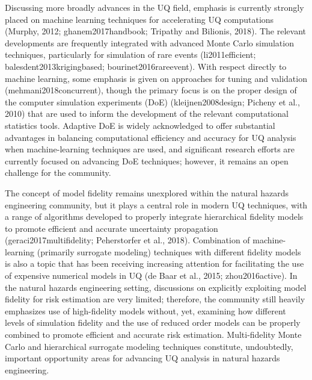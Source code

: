 Discussing more broadly advances in the UQ field, emphasis is currently strongly placed on machine learning techniques for accelerating UQ computations (Murphy, 2012; ghanem2017handbook; Tripathy and Bilionis, 2018). The relevant developments are frequently integrated with advanced Monte Carlo simulation techniques, particularly for simulation of rare events (li2011efficient; balesdent2013krigingbased; bourinet2016rareevent). With respect directly to machine learning, some emphasis is given on approaches for tuning and validation (mehmani2018concurrent), though the primary focus is on the proper design of the computer simulation experiments (DoE) (kleijnen2008design; Picheny et al., 2010) that are used to inform the development of the relevant computational statistics tools. Adaptive DoE is widely acknowledged to offer substantial advantages in balancing computational efficiency and accuracy for UQ analysis when machine-learning techniques are used, and significant research efforts are currently focused on advancing DoE techniques; however, it remains an open challenge for the community. 

The concept of model fidelity remains unexplored within the natural hazards engineering community, but it plays a central role in modern UQ techniques, with a range of algorithms developed to properly integrate hierarchical fidelity models to promote efficient and accurate uncertainty propagation (geraci2017multifidelity; Peherstorfer et al., 2018). Combination of machine-learning (primarily surrogate modeling) techniques with different fidelity models is also a topic that has been receiving increasing attention for facilitating the use of expensive numerical models in UQ (de Baar et al., 2015; zhou2016active). In the natural hazards engineering setting, discussions on explicitly exploiting model fidelity for risk estimation are very limited; therefore, the community still heavily emphasizes use of high-fidelity models without, yet, examining how different levels of simulation fidelity and the use of reduced order models can be properly combined to promote efficient and accurate risk estimation. Multi-fidelity Monte Carlo and hierarchical surrogate modeling techniques constitute, undoubtedly, important opportunity areas for advancing UQ analysis in natural hazards engineering.

